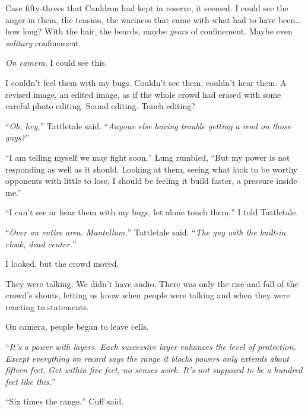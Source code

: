 Case fifty-threes that Cauldron had kept in reserve, it seemed.  I could see the anger in them, the tension, the wariness that came with what had to have been\ldots how long?  With the hair, the beards, maybe \emph{years} of confinement.  Maybe even \emph{solitary} confinement.



\emph{On camera}, I could see this.



I couldn't feel them with my bugs.  Couldn't see them, couldn't hear them.  A revised image, an edited image, as if the whole crowd had erased with some careful photo editing.  Sound editing.  Touch editing?



``\emph{Oh, hey,}'' Tattletale said.  ``\emph{Anyone else having trouble getting a read on those guys?}''



``I am telling myself we may fight soon,'' Lung rumbled, ``But my power is not responding as well as it should.  Looking at them, seeing what look to be worthy opponents with little to lose, I should be feeling it build faster, a pressure inside me.''



``I can't see or hear them with my bugs, let alone touch them,'' I told Tattletale.



``\emph{Over an entire area.  Mantellum,}'' Tattletale said.  ``\emph{The guy with the built-in cloak, dead center.}''



I looked, but the crowd moved.



They were talking.  We didn't have audio.  There was only the rise and fall of the crowd's shouts, letting us know when people were talking and when they were reacting to statements.



On camera, people began to leave cells.



``\emph{It's a power with layers.  Each successive layer enhances the level of protection.  Except everything on record says the range it blocks powers only extends about fifteen feet.  Get within five feet, no senses work.  It's not supposed to be a hundred feet like this.}''



``Six times the range,'' Cuff said.



